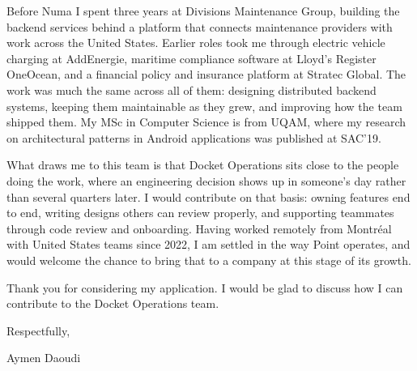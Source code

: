 \documentclass[letterpaper,10pt]{article}
\begin{document}
Before Numa I spent three years at Divisions Maintenance Group, building the
backend services behind a platform that connects maintenance providers with work
across the United States. Earlier roles took me through electric vehicle charging
at AddEnergie, maritime compliance software at Lloyd's Register OneOcean, and a
financial policy and insurance platform at Stratec Global. The work was much the
same across all of them: designing distributed backend systems, keeping them
maintainable as they grew, and improving how the team shipped them. My MSc in
Computer Science is from UQAM, where my research on architectural patterns in
Android applications was published at SAC'19.

What draws me to this team is that Docket Operations sits close to the people
doing the work, where an engineering decision shows up in someone's day rather
than several quarters later. I would contribute on that basis: owning features
end to end, writing designs others can review properly, and supporting teammates
through code review and onboarding. Having worked remotely from Montréal with
United States teams since 2022, I am settled in the way Point operates, and would
welcome the chance to bring that to a company at this stage of its growth.

Thank you for considering my application. I would be glad to discuss how I can
contribute to the Docket Operations team.

\vspace{6pt}

Respectfully,

\vspace{4pt}

Aymen Daoudi
\end{document}
